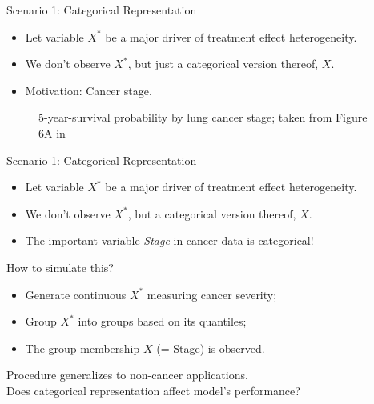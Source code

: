 \documentclass[11pt]{beamer}
\begin{document}
\begin{frame}{Scenario 1: Categorical Representation}
\begin{itemize}
\item Let variable $X^*$ be a major driver of treatment effect heterogeneity.
\item We don't observe $X^*$, but just a categorical version thereof, $X$.
\item Motivation: Cancer stage.
\end{itemize}

\begin{figure}
	\caption{5-year-survival probability by lung cancer stage; taken from Figure 6A in \cite{groome2007}}
\end{figure}
\end{frame}


\begin{frame}{Scenario 1: Categorical Representation}
\begin{itemize}
\item Let variable $X^*$ be a major driver of treatment effect heterogeneity.
\item We don't observe $X^*$, but a categorical version thereof, $X$.
\item The important variable \textit{Stage} in cancer data is categorical!\bigskip
\end{itemize}

How to simulate this?
\begin{itemize}
	\item Generate continuous $X^*$ measuring cancer severity;
	\item Group $X^*$ into groups based on its quantiles;
	\item The group membership $X$ (= Stage) is observed.\bigskip
\end{itemize}
Procedure generalizes to non-cancer applications.\\\bigskip
\textcolor{emc-darkblue}{} \alert{Does categorical representation affect model's performance?}
\end{frame}
\end{document}
